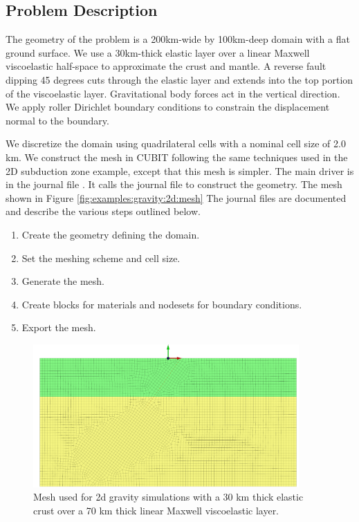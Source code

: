 \subsection{Problem Description}

The geometry of the problem is a 200km-wide by 100km-deep domain with
a flat ground surface. We use a 30km-thick elastic layer over a linear
Maxwell viscoelastic half-space to approximate the crust and mantle.
A reverse fault dipping 45 degrees cuts through the elastic layer
and extends into the top portion of the viscoelastic layer. Gravitational
body forces act in the vertical direction. We apply roller Dirichlet
boundary conditions to constrain the displacement normal to the boundary.

We discretize the domain using quadrilateral cells with a nominal
cell size of 2.0 km. We construct the mesh in CUBIT following the
same techniques used in the 2D subduction zone example, except that
this mesh is simpler. The main driver is in the journal file .
It calls the journal file  to construct the geometry.
The mesh shown in Figure \vref{fig:examples:gravity:2d:mesh} The journal
files are documented and describe the various steps outlined below.
\begin{enumerate}
\item Create the geometry defining the domain.
\item Set the meshing scheme and cell size.
\item Generate the mesh.
\item Create blocks for materials and nodesets for boundary conditions.
\item Export the mesh.
\end{enumerate}

\begin{figure}
  \includegraphics[width=4in]{examples/figs/grav2d_mesh}
  \caption{Mesh used for 2d gravity simulations with a 30 km thick elastic crust
    over a 70 km thick linear Maxwell viscoelastic layer.}
  \label{fig:examples:gravity:2d:mesh}
\end{figure}


